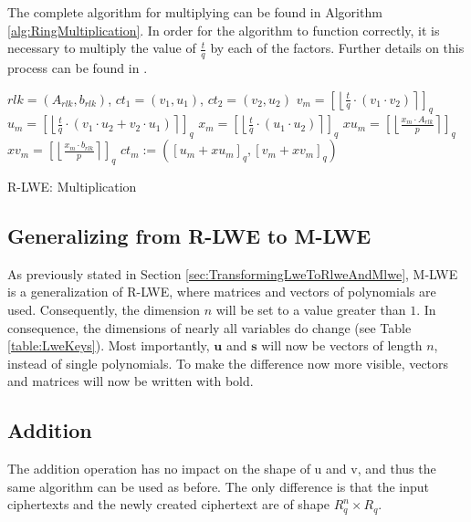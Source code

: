 The complete algorithm for multiplying can be found in Algorithm \ref{alg:RingMultiplication}. In order for the algorithm to function correctly, it is necessary to multiply the value of $\frac{t}{q}$ by each of the factors. Further details on this process can be found in \cite{bfv}.

\begin{algorithm}[htb]
  \begin{algorithmic}[1]
    \REQUIRE $rlk=(A_{rlk}, b_{rlk})$, $ct_1 = (v_1, u_1)$, $ct_2 = (v_2, u_2)$
    \STATE $v_m = \left[\left\lfloor \frac{t}{q}\cdot (v_1 \cdot v_2)\right\rceil\right] _q $
    \STATE $u_m = \left[\left\lfloor \frac{t}{q}\cdot(v_1 \cdot u_2 + v_2 \cdot u_1)\right\rceil\right] _q$
    \STATE $x_m = \left[\left\lfloor \frac{t}{q}\cdot(u_1 \cdot u_2)\right\rceil\right] _q$
    \STATE $xu_m = \left[\left\lfloor \frac{x_m \cdot A_{rlk}}{p}  \right\rceil \right]_q$
    \STATE $xv_m = \left[\left\lfloor \frac{x_m \cdot b_{rlk}}{p}  \right\rceil \right]_q$
    \RETURN $ct_m:=(\left[u_m + xu_m\right]_q , \left[v_m + xv_m\right]_q )$
  \end{algorithmic}
  \caption{R-LWE: Multiplication}
  \label{alg:RingMultiplication}
\end{algorithm}

\subsection{Generalizing from R-LWE to M-LWE}

As previously stated in Section \ref{sec:TransformingLweToRlweAndMlwe}, M-LWE is a generalization of R-LWE, where matrices and vectors of polynomials are used. Consequently, the dimension $n$ will be set to a value greater than $1$. In consequence, the dimensions of nearly all variables do change (see Table \ref{table:LweKeys}). Most importantly, $\textbf{u}$ and $\textbf{s}$ will now be vectors of length $n$, instead of single polynomials. To make the difference now more visible, vectors and matrices will now be written with bold.

\subsection*{Addition}

The addition operation has no impact on the shape of u and v, and thus the same algorithm can be used as before. The only difference is that the input ciphertexts and the newly created ciphertext are of shape $R_q^{n}\times R_q$.

